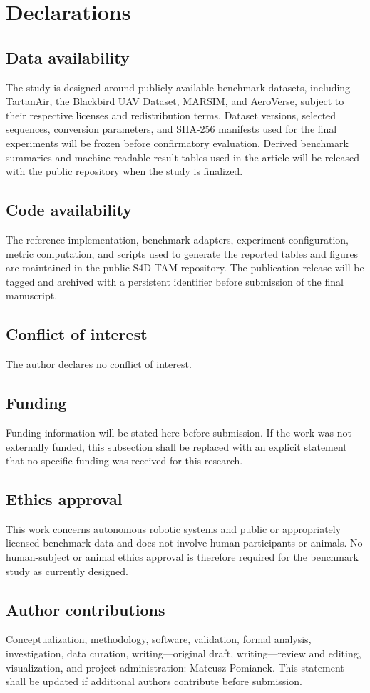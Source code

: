 \section{Declarations}
\label{sec:declarations}

\subsection{Data availability}
The study is designed around publicly available benchmark datasets, including TartanAir, the Blackbird UAV Dataset, MARSIM, and AeroVerse, subject to their respective licenses and redistribution terms. Dataset versions, selected sequences, conversion parameters, and SHA-256 manifests used for the final experiments will be frozen before confirmatory evaluation. Derived benchmark summaries and machine-readable result tables used in the article will be released with the public repository when the study is finalized.

\subsection{Code availability}
The reference implementation, benchmark adapters, experiment configuration, metric computation, and scripts used to generate the reported tables and figures are maintained in the public S4D-TAM repository. The publication release will be tagged and archived with a persistent identifier before submission of the final manuscript.

\subsection{Conflict of interest}
The author declares no conflict of interest.

\subsection{Funding}
Funding information will be stated here before submission. If the work was not externally funded, this subsection shall be replaced with an explicit statement that no specific funding was received for this research.

\subsection{Ethics approval}
This work concerns autonomous robotic systems and public or appropriately licensed benchmark data and does not involve human participants or animals. No human-subject or animal ethics approval is therefore required for the benchmark study as currently designed.

\subsection{Author contributions}
Conceptualization, methodology, software, validation, formal analysis, investigation, data curation, writing---original draft, writing---review and editing, visualization, and project administration: Mateusz Pomianek. This statement shall be updated if additional authors contribute before submission.
